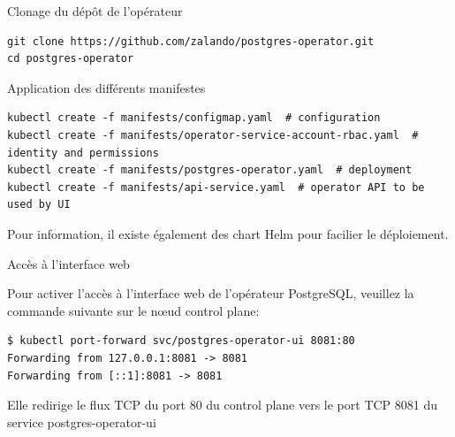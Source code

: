 
\begin{frame}[fragile]{Clonage du dépôt de l'opérateur}
   
\begin{tiny}
\begin{Verbatim}[commandchars=\&\#\#]
git clone https://github.com/zalando/postgres-operator.git
cd postgres-operator
\end{Verbatim}
\end{tiny}

\end{frame}


\begin{frame}[fragile]{Application des différents manifestes}
   
\begin{tiny}
\begin{Verbatim}[commandchars=\&\{\}]
kubectl create -f manifests/configmap.yaml  # configuration
kubectl create -f manifests/operator-service-account-rbac.yaml  # identity and permissions
kubectl create -f manifests/postgres-operator.yaml  # deployment
kubectl create -f manifests/api-service.yaml  # operator API to be used by UI
\end{Verbatim}
\end{tiny}

   Pour information, il existe également des chart Helm pour facilier le déploiement.

\end{frame}


\begin{frame}[fragile]{Accès à l'interface web}
   
   Pour activer l'accès à l'interface web de l'opérateur PostgreSQL, veuillez la commande suivante sur le n\oe{}ud control plane:
\begin{tiny}
\begin{Verbatim}[commandchars=\&\{\}]
$ kubectl port-forward svc/postgres-operator-ui 8081:80
Forwarding from 127.0.0.1:8081 -> 8081
Forwarding from [::1]:8081 -> 8081

\end{Verbatim}
\end{tiny}

   Elle redirige le flux TCP du port 80 du control plane vers le port TCP 8081 du service postgres-operator-ui

\end{frame}

